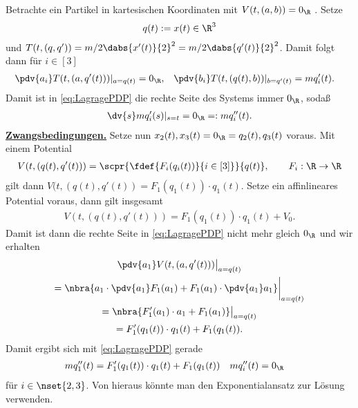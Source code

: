 \documentclass[../WiSe22ANA3.tex]{subfiles}
\begin{document}
		\begin{bsp}
			Betrachte ein Partikel in kartesischen Koordinaten mit $V(t,(a,b))=0_\R$	. Setze
			\begin{align*}
				q(t):=x(t)\in\R^3
			\end{align*}
			und $T(t,(q,q'))=m/2\dabs{x'(t)}{2}^2=m/2\dabs{q'(t)}{2}^2$. Damit folgt dann für $i\in[3]$ 
			\begin{align*}
				&\pdv{a_i}T(t,(a,q'(t)))|_{a=q(t)}=0_\R, &&\pdv{b_i}T(t,(q(t),b))|_{b=q'(t)}=mq_i'(t).
			\end{align*}
			Damit ist in \eqref{eq:LagragePDP} die rechte Seite des Systems immer $0_\R$, sodaß
			\begin{align*}
				\dv{s}mq_i'(s)|_{s=t}=0_\R=:mq''_i(t).
			\end{align*}
			\underline{\textbf{Zwangsbedingungen.}} Setze nun $x_2(t),x_3(t)=0_\R=q_2(t),q_3(t)$ voraus. Mit einem Potential 
			\begin{align*}
				V(t,(q(t),q'(t)))=\scpr{\fdef{F_i(q_i(t))}{i\in[3]}}{q(t)},\qquad F_i:\R\to\R
			\end{align*}
			gilt dann $V(t,(q(t),q'(t))=F_1(q_1(t))\cdot q_1(t)$. Setze ein affinlineares Potential voraus, dann gilt insgesamt
			\begin{align*}
				V(t,(q(t),q'(t)))=F_1(q_1(t))\cdot q_1(t)+V_0.
			\end{align*}
			Damit ist dann die rechte Seite in \eqref{eq:LagragePDP} nicht mehr gleich $0_\R$ und wir erhalten
			\begin{multline*}
				\pdv{a_1}V(t,(a,q'(t)))\big|_{a=q(t)}\\
				=\nbra{a_1\cdot \pdv{a_1}F_1(a_1)+F_1(a_1)\cdot\pdv{a_1}a_1}\bigg|_{a=q(t)} \\
				=\nbra{F_1'(a_1)\cdot a_1+F_1(a_1)}\big|_{a=q(t)} \\
				=F_1'(q_1(t))\cdot q_1(t)+F_1(q_1(t)).
			\end{multline*}
			Damit ergibt sich mit \eqref{eq:LagragePDP} gerade
			\begin{align*}
				& mq_1''(t)=F_1'(q_1(t))\cdot q_1(t)+F_1(q_1(t)) &&mq_i''(t)=0_\R
			\end{align*}
			für $i\in\nset{2,3}$. Von hieraus könnte man den Exponentialansatz zur Lösung verwenden. 
 		\end{bsp}
\end{document}
